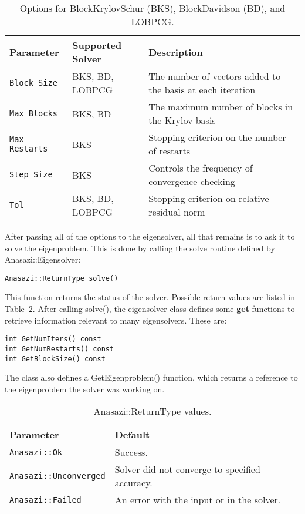 \begin{table}
\begin{center}
\begin{tabular}{| l | l | p{6cm} |}
\hline
Parameter & Supported Solver & Description \\
\hline
{\tt Block Size}   & BKS, BD, LOBPCG & The number of vectors added to the basis at each iteration \\
{\tt Max Blocks}   & BKS, BD         & The maximum number of blocks in the Krylov basis \\
{\tt Max Restarts} & BKS             & Stopping criterion on the number of restarts \\
{\tt Step Size}    & BKS             & Controls the frequency of convergence checking \\
{\tt Tol}          & BKS, BD, LOBPCG & Stopping criterion on relative residual norm \\
\hline
\end{tabular}
\caption{Options for BlockKrylovSchur (BKS), BlockDavidson (BD), and LOBPCG.}
\label{tab:anasazi:solver_params}
\end{center}
\end{table}

After passing all of the options to the eigensolver, all that remains is to ask
it to solve the eigenproblem. This is done by calling the solve routine 
defined by Anasazi::Eigensolver:
\begin{verbatim}
Anasazi::ReturnType solve()
\end{verbatim}
This function returns the status of the solver. Possible return values are
listed in Table~\ref{tab:anasazi:rt}. After calling solve(), the
eigensolver class defines some \textbf{get} functions to retrieve information
relevant to many eigensolvers. These are:
\begin{verbatim}
int GetNumIters() const
int GetNumRestarts() const
int GetBlockSize() const 
\end{verbatim}
The class also defines a GetEigenproblem() function, which returns a
reference to the eigenproblem the solver was working on.

\begin{table}
\begin{center}
\begin{tabular}{| p{6cm} l |}
\hline
Parameter & Default \\
\hline
\verb!Anasazi::Ok!         & Success. \\
\verb!Anasazi::Unconverged!& Solver did not converge to specified accuracy. \\
\verb!Anasazi::Failed!     & An error with the input or in the solver. \\
\hline
\end{tabular}
\caption{Anasazi::ReturnType values.}
\label{tab:anasazi:rt}
\end{center}
\end{table}

